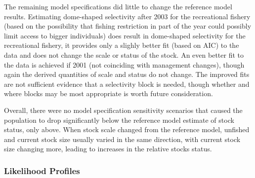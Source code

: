 \documentclass[11pt,
  english,
  a4paper,
]{article}
\begin{document}
The remaining model specifications did little to change the reference model results. Estimating dome-shaped selectivity after 2003 for the recreational fishery (based on the possibility that fishing restriction in part of the year could possibly limit access to bigger individuals) does result in dome-shaped selectivity for the recreational fishery, it provides only a slighly better fit (based on AIC) to the data and does not change the scale or status of the stock. An even better fit to the data is achieved if 2001 (not coinciding with management changes), though again the derived quantities of scale and status do not change. The improved fits are not sufficient evidence that a selectivity block is needed, though whether and where blocks may be most appropriate is worth future consideration.

\leavevmode\tagmcend\tagstructend\par


Overall, there were no model specification sensitivity scenarios that caused the population to drop significantly below the reference model estimate of stock status, only above. When stock scale changed from the reference model, unfished and current stock size usually varied in the same direction, with current stock size changing more, leading to increases in the relative stocks status.

\leavevmode\tagmcend\tagstructend\par


\hypertarget{likelihood-profiles}{%
\subsubsection{Likelihood Profiles}\label{likelihood-profiles}}

\leavevmode\tagmcend\tagstructend

\end{document}
